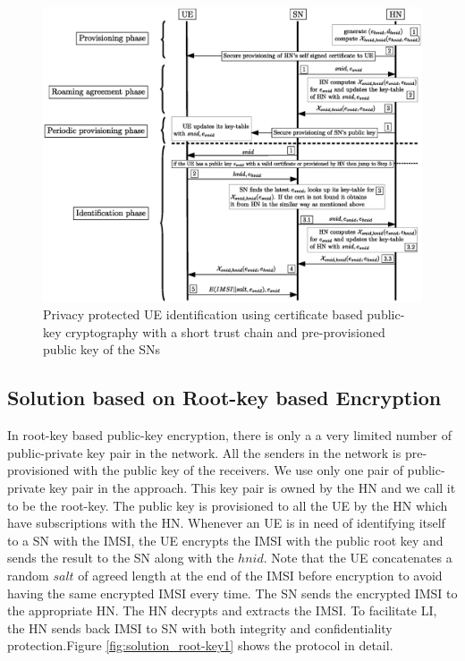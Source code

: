 \documentclass[lnicst,sechang,a4paper]{svmultln}
\begin{document}
\begin{figure}
\begin{center}
  \includegraphics[width=.98\textwidth]{root-key3.eps}
\caption{Privacy protected UE identification using certificate based public-key cryptography with a short trust chain and pre-provisioned public key of the SNs}
\label{fig:solution_certificate_root_key_hybrid}       %
\end{center}
\end{figure}



\subsection{Solution based on Root-key based Encryption} 
\label{sub_sec:solution_root-key}
In root-key based public-key encryption, there is only a a very limited number of public-private key pair in the network. All the senders in the network is pre-provisioned with the public key of the receivers. We use only one pair of public-private key pair in the approach. This key pair is owned by the HN and we call it to be the root-key. The public key is provisioned to all the UE by the HN which have subscriptions with the HN. Whenever an UE is in need of identifying itself to a SN with the IMSI, the UE encrypts the IMSI with the public root key and sends the result to the SN along with the $hnid$. Note that the UE concatenates a random $salt$ of agreed length at the end of the IMSI before encryption to avoid having the same encrypted IMSI every time. The SN sends the encrypted IMSI to the appropriate HN. The HN decrypts and extracts the IMSI. To facilitate LI, the HN sends back IMSI to SN with both integrity and confidentiality protection.Figure \ref{fig:solution_root-key1} shows the protocol in detail.
\end{document}
